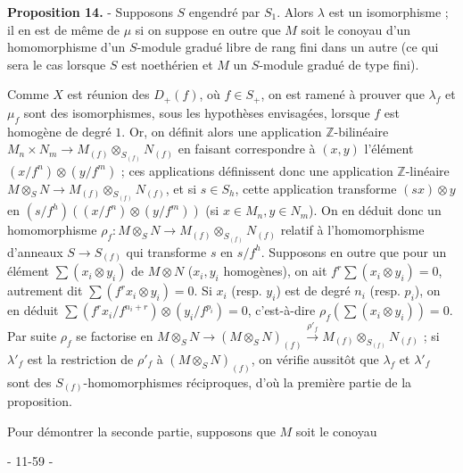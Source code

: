 \textbf{Proposition 14.} - Supposons $S$ engendré par $S_1$. Alors $\lambda$ est un isomorphisme ; il en est de même de $\mu$ si on suppose en outre que $M$ soit le conoyau d'un homomorphisme d'un $S$-module gradué libre de rang fini dans un autre (ce qui sera le cas lorsque $S$ est noethérien et $M$ un $S$-module gradué de type fini).

Comme $X$ est réunion des $D_+(f)$, où $f \in S_+$, on est ramené à prouver que $\lambda_f$ et $\mu_f$ sont des isomorphismes, sous les hypothèses envisagées, lorsque $f$ est homogène de degré $1$. Or, on définit alors une application $\mathbb{Z}$-bilinéaire $M_n \times N_m \to M_{(f)} \otimes_{S_{(f)}} N_{(f)}$ en faisant correspondre à $(x,y)$ l'élément $(x/f^n) \otimes (y/f^m)$ ; ces applications définissent donc une application $\mathbb{Z}$-linéaire $M \otimes_S N \to M_{(f)} \otimes_{S_{(f)}} N_{(f)}$, et si $s \in S_h$, cette application transforme $(sx) \otimes y$ en $(s/f^h)((x/f^n) \otimes (y/f^m))$ (si $x \in M_n, y \in N_m$). On en déduit donc un homomorphisme $\rho_f : M \otimes_S N \to M_{(f)} \otimes_{S_{(f)}} N_{(f)}$ relatif à l'homomorphisme d'anneaux $S \to S_{(f)}$ qui transforme $s$ en $s/f^h$. Supposons en outre que pour un élément $\sum (x_i \otimes y_i)$ de $M \otimes N$ ($x_i, y_i$ homogènes), on ait $f^r \sum (x_i \otimes y_i) = 0$, autrement dit $\sum (f^r x_i \otimes y_i) = 0$. Si $x_i$ (resp. $y_i$) est de degré $n_i$ (resp. $p_i$), on en déduit $\sum (f^r x_i / f^{n_i+r}) \otimes (y_i / f^{p_i}) = 0$, c'est-à-dire $\rho_f (\sum (x_i \otimes y_i)) = 0$. Par suite $\rho_f$ se factorise en $M \otimes_S N \to (M \otimes_S N)_{(f)} \xrightarrow{\rho'_f} M_{(f)} \otimes_{S_{(f)}} N_{(f)}$ ; si $\lambda'_f$ est la restriction de $\rho'_f$ à $(M \otimes_S N)_{(f)}$, on vérifie aussitôt que $\lambda_f$ et $\lambda'_f$ sont des $S_{(f)}$-homomorphismes réciproques, d'où la première partie de la proposition.

Pour démontrer la seconde partie, supposons que $M$ soit le conoyau

\newpage


- 11-59 -

